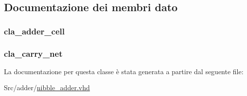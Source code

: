 \subsection{Documentazione dei membri dato}
\hypertarget{classnibble__adder_1_1structural_a9d7a8a381439c61aea549e7a47ec7a6f}{
\subsubsection[{adder}]{ {\bfseries \textcolor{vhdlchar}{cla\+\_\+adder\+\_\+cell}\textcolor{vhdlchar}{ }} \hspace{0.3cm}{\ttfamily [Instantiation]}}}\label{classnibble__adder_1_1structural_a9d7a8a381439c61aea549e7a47ec7a6f}
\hypertarget{classnibble__adder_1_1structural_abbf8fdf15c2d70392ab929c8ebe57439}{
\subsubsection[{cla\+\_\+net}]{ {\bfseries \textcolor{vhdlchar}{cla\+\_\+carry\+\_\+net}\textcolor{vhdlchar}{ }} \hspace{0.3cm}{\ttfamily [Instantiation]}}}\label{classnibble__adder_1_1structural_abbf8fdf15c2d70392ab929c8ebe57439}


La documentazione per questa classe è stata generata a partire dal seguente file\+:\begin{DoxyCompactItemize}
\item 
Src/adder/\hyperlink{nibble__adder_8vhd}{nibble\+\_\+adder.\+vhd}\end{DoxyCompactItemize}
